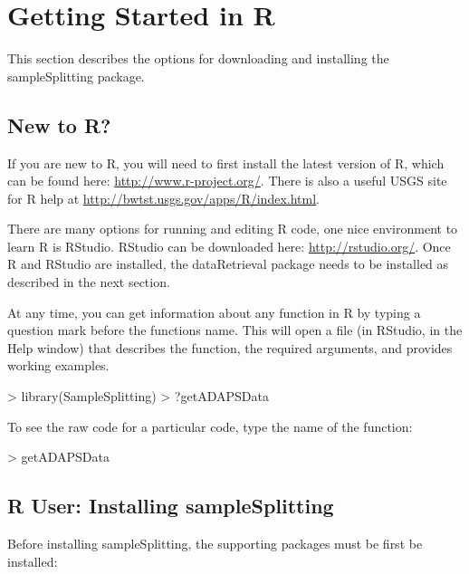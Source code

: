 \documentclass[a4paper,11pt]{article}
\begin{document}
\section{Getting Started in R}
\label{sec:started}
This section describes the options for downloading and installing the sampleSplitting package.

\subsection{New to R?}
If you are new to R, you will need to first install the latest version of R, which can be found here: \url{http://www.r-project.org/}. There is also a useful USGS site for R help at \url{http://bwtst.usgs.gov/apps/R/index.html}.

There are many options for running and editing R code, one nice environment to learn R is RStudio. RStudio can be downloaded here: \url{http://rstudio.org/}. Once R and RStudio are installed, the dataRetrieval package needs to be installed as described in the next section.

At any time, you can get information about any function in R by typing a question mark before the functions name.  This will open a file (in RStudio, in the Help window) that describes the function, the required arguments, and provides working examples.

\begin{Schunk}
\begin{Sinput}
> library(SampleSplitting)
> ?getADAPSData
\end{Sinput}
\end{Schunk}

To see the raw code for a particular code, type the name of the function:
\begin{Schunk}
\begin{Sinput}
> getADAPSData
\end{Sinput}
\end{Schunk}

\subsection{R User: Installing sampleSplitting}
Before installing sampleSplitting, the supporting packages must be first be installed:
\end{document}
